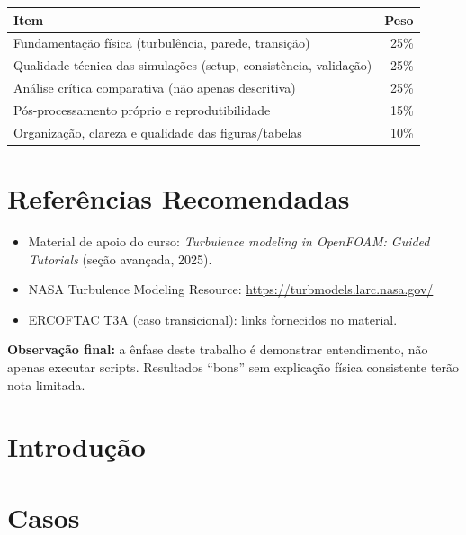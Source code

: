 \documentclass[12pt,a4paper]{article}
\begin{document}
\begin{center}
\begin{tabular}{>{\raggedright\arraybackslash}p{10cm} r}
  \toprule
  \textbf{Item} & \textbf{Peso} \\
  \midrule
  Fundamentação física (turbulência, parede, transição)          & 25\% \\
  Qualidade técnica das simulações (setup, consistência, validação) & 25\% \\
  Análise crítica comparativa (não apenas descritiva)             & 25\% \\
  Pós-processamento próprio e reprodutibilidade                   & 15\% \\
  Organização, clareza e qualidade das figuras/tabelas            & 10\% \\
  \bottomrule
\end{tabular}
\end{center}

\section{Referências Recomendadas}

\begin{itemize}
  \item Material de apoio do curso: \textit{Turbulence modeling in OpenFOAM: Guided Tutorials} (seção avançada, 2025).
  \item NASA Turbulence Modeling Resource: \url{https://turbmodels.larc.nasa.gov/}
  \item ERCOFTAC T3A (caso transicional): links fornecidos no material.
\end{itemize}

\vspace{1em}
\noindent\textbf{Observação final:} a ênfase deste trabalho é demonstrar entendimento, não apenas executar scripts. Resultados ``bons'' sem explicação física consistente terão nota limitada.

\newpage


\section{Introdução}


\section{Casos}
\end{document}
